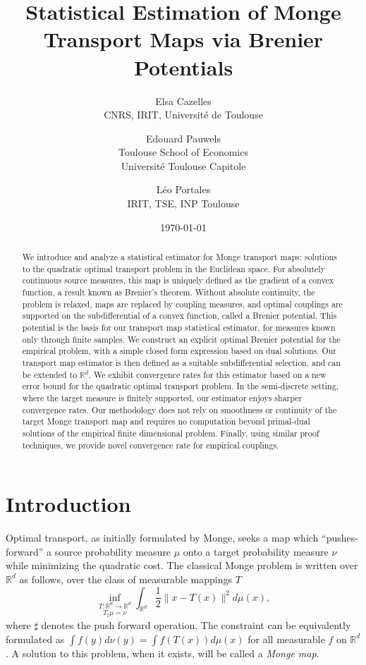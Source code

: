 \documentclass[11pt]{article}
\newcommand{\R}{\mathbb R}
\newcommand{\1}{\mathbbm{1}}
\numberwithin{equation}{section}
\begin{document}
\title{Statistical Estimation of Monge Transport Maps via Brenier Potentials}
\author{
  Elsa Cazelles\\
  CNRS, IRIT, Université de Toulouse
  \and
  Edouard Pauwels\\
  Toulouse School of Economics\\ Université Toulouse Capitole
  \and
  Léo Portales\\
  IRIT, TSE, INP Toulouse
}
\date{\today}
\maketitle


\begin{abstract}
We introduce and analyze a statistical estimator for Monge transport maps: solutions to the quadratic optimal transport problem in the Euclidean space. For absolutely continuous source measures, this map is uniquely defined as the gradient of a convex function, a result known as Brenier’s theorem. Without absolute continuity, the problem is relaxed, maps are replaced by coupling measures, and optimal couplings are supported on the subdifferential of a convex function, called a Brenier potential. This potential is the basis for our transport map statistical estimator, for measures known only through finite samples. We construct an explicit optimal Brenier potential for the empirical problem, with a simple closed form expression based on dual solutions. Our transport map estimator is then defined as a suitable subdifferential selection, and can be extended to $\R^d$.
We exhibit convergence rates for this estimator based on a new error bound for the quadratic optimal transport problem. In the semi-discrete setting, where the target measure is finitely supported, our estimator enjoys sharper convergence rates. Our methodology does not rely on smoothness or continuity of the target Monge transport map and requires no computation beyond primal-dual solutions of the empirical finite dimensional problem. Finally, using similar proof techniques, we provide novel convergence rate for empirical couplings.
\end{abstract}


\section{Introduction}

Optimal transport, as initially formulated by Monge, seeks a map which ``pushes-forward'' a source probability measure $\mu$ onto a target probability measure $\nu$ while minimizing the quadratic cost. The classical Monge problem is written over $\R^d$ as follows, over the class of measurable mappings $T$
\begin{equation}
    \label{eq:preliminary_Monge}
    \underset{T_\sharp\mu=\nu}{\inf_{T\colon\R^d\to\R^d}}\int_{\R^d}\frac{1}{2}\|x-T(x)\|^2d\mu(x),
\end{equation}
where $\sharp$ denotes the push forward operation. The constraint can be equivalently formulated as $\int f(y) d\nu(y) = \int f(T(x)) d \mu(x)$ for all measurable $f$ on $\R^d$.
A solution to this problem, when it exists, will be called a \textit{Monge map}. 
\end{document}
